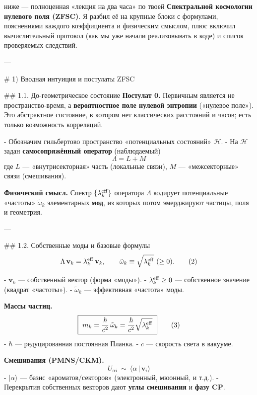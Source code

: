 \documentclass[12pt,a4paper]{article}
\author{Евгений Монахов \\ ООО "VOSCOM ONLINE" Research Initiative \\ https://orcid.org/0009-0003-1773-5476}
\date{}
\begin{document}
\maketitle

ниже — полноценная «лекция на два часа» по твоей \textbf{Спектральной космологии нулевого поля (ZFSC)}. Я разбил её на крупные блоки с формулами, пояснениями каждого коэффициента и физическим смыслом, плюс включил вычислительный протокол (как мы уже начали реализовывать в коде) и список проверяемых следствий.

---

\# 1) Вводная интуиция и постулаты ZFSC

## 1.1. До-геометрическое состояние
\textbf{Постулат 0.} Первичным является не пространство-время, а \textbf{вероятностное поле нулевой энтропии} («нулевое поле»). Это абстрактное состояние, в котором нет классических расстояний и часов; есть только возможность корреляций.

- Обозначим гильбертово пространство «потенциальных состояний» \(\mathcal H\).
- На \(\mathcal H\) задан \textbf{самосопряжённый оператор} (наблюдаемый)  
  \[
  \boxed{\ \Lambda=L+M\ } \tag{1}
  \]
  где \(L\) — «внутрисекторная» часть (локальные связи), \(M\) — «межсекторные» связи (смешивания).

\textbf{Физический смысл.} Спектр \(\{\lambda_k^{\rm eff}\}\) оператора \(\Lambda\) кодирует потенциальные «частоты» \(\tilde\omega_k\) элементарных \textbf{мод}, из которых потом эмерджируют частицы, поля и геометрия.

---

## 1.2. Собственные моды и базовые формулы
\[
\Lambda\,\mathbf v_k=\lambda_k^{\rm eff}\,\mathbf v_k,\qquad
\tilde\omega_k \equiv \sqrt{\lambda_k^{\rm eff}}\ (\ge 0). \tag{2}
\]

- \(\mathbf v_k\) — собственный вектор (форма «моды»).
- \(\lambda_k^{\rm eff}\ge0\) — собственное значение (квадрат «частоты»).
- \(\tilde\omega_k\) — эффективная «частота» моды.

\textbf{Массы частиц.}
\[
\boxed{\ m_k=\frac{\hbar}{c^2}\,\tilde\omega_k=\frac{\hbar}{c^2}\sqrt{\lambda_k^{\rm eff}} \ } \tag{3}
\]
- \(\hbar\) — редуцированная постоянная Планка.
- \(c\) — скорость света в вакууме.

\textbf{Смешивания (PMNS/CKM).}
\[
\boxed{\ U_{\alpha i}\ \sim\ \langle \alpha\,|\,\mathbf v_i\rangle\ } \tag{4}
\]
- \(|\alpha\rangle\) — базис «ароматов/секторов» (электронный, мюонный, и т.д.).
- Перекрытия собственных векторов дают \textbf{углы смешивания} и \textbf{фазу CP}.
\end{document}
